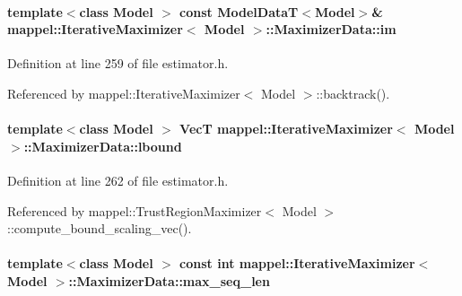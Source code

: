 \paragraph[{\texorpdfstring{im}{im}}]{\setlength{\rightskip}{0pt plus 5cm}template$<$class Model $>$ const {\bf Model\+DataT}$<$Model$>$\& {\bf mappel\+::\+Iterative\+Maximizer}$<$ Model $>$\+::Maximizer\+Data\+::im}\hypertarget{classmappel_1_1IterativeMaximizer_1_1MaximizerData_afcee3fa283be1a9ba1d197ed777d447c}{}\label{classmappel_1_1IterativeMaximizer_1_1MaximizerData_afcee3fa283be1a9ba1d197ed777d447c}


Definition at line 259 of file estimator.\+h.



Referenced by mappel\+::\+Iterative\+Maximizer$<$ Model $>$\+::backtrack().

\paragraph[{\texorpdfstring{lbound}{lbound}}]{\setlength{\rightskip}{0pt plus 5cm}template$<$class Model $>$ {\bf VecT} {\bf mappel\+::\+Iterative\+Maximizer}$<$ Model $>$\+::Maximizer\+Data\+::lbound}\hypertarget{classmappel_1_1IterativeMaximizer_1_1MaximizerData_aead80fc0e12236ca355849ad36749094}{}\label{classmappel_1_1IterativeMaximizer_1_1MaximizerData_aead80fc0e12236ca355849ad36749094}


Definition at line 262 of file estimator.\+h.



Referenced by mappel\+::\+Trust\+Region\+Maximizer$<$ Model $>$\+::compute\+\_\+bound\+\_\+scaling\+\_\+vec().

\paragraph[{\texorpdfstring{max\+\_\+seq\+\_\+len}{max_seq_len}}]{\setlength{\rightskip}{0pt plus 5cm}template$<$class Model $>$ const int {\bf mappel\+::\+Iterative\+Maximizer}$<$ Model $>$\+::Maximizer\+Data\+::max\+\_\+seq\+\_\+len\hspace{0.3cm}{\ttfamily [protected]}}\hypertarget{classmappel_1_1IterativeMaximizer_1_1MaximizerData_aee106ddaebe30496f5280095fc01301a}{}\label{classmappel_1_1IterativeMaximizer_1_1MaximizerData_aee106ddaebe30496f5280095fc01301a}


